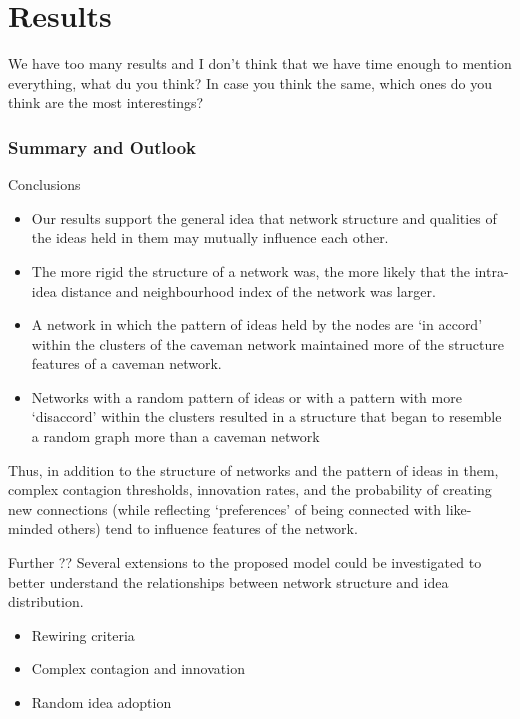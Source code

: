 \documentclass{beamer}
\begin{document}
\section{Results}
%
\begin{frame}
\alert{We have too many results and I don't think that we have time enough to mention everything, what du you think? In case you think the same, which ones do you think are the most interestings?}
\end{frame}
%
\begin{frame}
\frametitle{Summary and Outlook}
{Conclusions}
\begin{itemize}
\item Our results support the general idea that network structure and qualities of the ideas held in them may mutually influence each other. \pause
\item The more rigid the structure of a network was, the more likely that the intra-idea distance and neighbourhood index of the network was larger.\pause
\item A network in which the pattern of ideas held by the nodes are `in accord' within the clusters of the caveman network maintained more of the structure features of a caveman network. \pause 
\item Networks with a random pattern of ideas or with a pattern with more `disaccord' within the clusters resulted in a structure that began to resemble a random graph more than a caveman network\pause
\end{itemize}
\end{frame}
%
\begin{frame}
Thus, in addition to the structure of networks and the pattern of ideas in them, complex contagion thresholds, innovation rates, and the probability of creating new connections (while reflecting `preferences' of being connected with like-minded others) tend to influence features of the network. 
\end{frame}
%
\begin{frame}
{Further ??}
Several extensions to the proposed model could be investigated to better understand the relationships between network structure and idea distribution.\\ \pause

\begin{itemize}
\item Rewiring criteria\pause
\item Complex contagion and innovation \pause
\item Random idea adoption
\end{itemize}
\end{frame}
%
\end{document}
